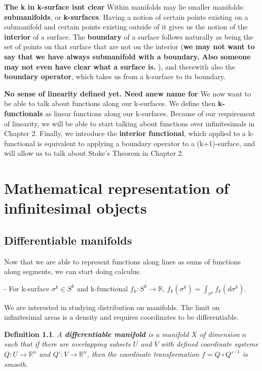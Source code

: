 \documentclass{book}
\newtheorem{defn}[equation]{Definition}
\begin{document}
\textbf{The k in k-surface isnt clear}
Within manifolds may lie smaller manifolds: \textbf{submanifolds}, or \textbf{k-surfaces}. Having a notion of certain points existing on a submanifold and certain points existing outside of it gives us the notion of the \textbf{interior} of a surface. The \textbf{boundary} of a surface follows naturally as being the set of points on that surface that are not on the interior (\textbf{we may not want to say that we have always submanifold with a boundary. Also someone may not even have clear what a surface is. }), and therewith also the \textbf{boundary operator}, which takes us from a k-surface to its boundary. 

\textbf{No sense of linearity defined yet. Need anew name for }
We now want to be able to talk about functions along our k-surfaces. We define then \textbf{k-functionals} as linear functions along our k-surfaces. Because of our requirement of linearity, we will be able to start talking about functions over infinitesimals in Chapter 2. Finally, we introduce the \textbf{interior functional}, which applied to a k-functional is equivalent to applying a boundary operator to a (k+1)-surface, and will allow us to talk about Stoke's Theorem in Chapter 2.  





\chapter{Mathematical representation of infinitesimal objects}


\section{Differentiable manifolds}

Now that we are able to represent functions along lines as sums of functions along segments, we can start doing calculus. 


- For k-surface $\sigma^k \in S^k$ and k-functional $f_k: S^k \to \mathbb{R}$, $f_k(\sigma^k) = \int_{\sigma^k}f_k(d\sigma^k)$. 

We are interested in studying distribution on manifolds. The limit on infinitesimal areas is a density and requires coordinates to be differentiable.


\begin{defn}
	A \textbf{differentiable manifold} is a manifold $X$ of dimension $n$ such that if there are overlapping subsets $U$ and $V$ with defined coordinate systems $Q: U \to \mathbb{R}^n$ and $Q': V \to \mathbb{R}^n$, then the coordinate transformation $f = Q \circ Q'^{-1}$ is smooth. 
\end{defn}
\end{document}
